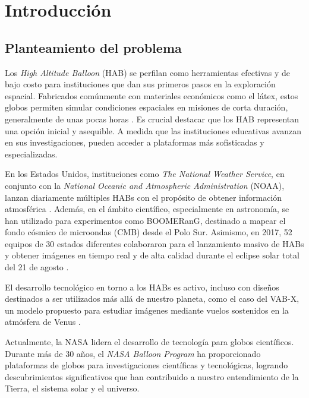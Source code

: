 \chapter{Introducción}

\section{Planteamiento del problema}
\vspace{1 cm}

Los \emph{High Altitude Balloon} (HAB) se perfilan como herramientas efectivas y de bajo costo para instituciones que dan sus primeros pasos en la exploración espacial. Fabricados comúnmente con materiales económicos como el látex, estos globos permiten simular condiciones espaciales en misiones de corta duración, generalmente de unas pocas horas \cite{Saad2015}. Es crucial destacar que los HAB representan una opción inicial y asequible. A medida que las instituciones educativas avanzan en sus investigaciones, pueden acceder a plataformas más sofisticadas y especializadas.

En los Estados Unidos, instituciones como \emph{The National Weather Service}, en conjunto con la \emph{National Oceanic and Atmospheric Administration} (NOAA), lanzan diariamente múltiples HABs con el propósito de obtener información atmosférica \cite{noaa_upperair, noaa_radiosondes}. Además, en el ámbito científico, especialmente en astronomía, se han utilizado para experimentos como BOOMERanG, destinado a mapear el fondo cósmico de microondas (CMB) desde el Polo Sur. Asimismo, en 2017, 52 equipos de 30 estados diferentes colaboraron para el lanzamiento masivo de HABs y obtener imágenes en tiempo real y de alta calidad durante el eclipse solar total del 21 de agosto \cite{Jarrell2017}.

El desarrollo tecnológico en torno a los HABs es activo, incluso con diseños destinados a ser utilizados más allá de nuestro planeta, como el caso del VAB-X, un modelo propuesto para estudiar imágenes mediante vuelos sostenidos en la atmósfera de Venus \cite{Bugga2022}.

Actualmente, la NASA lidera el desarrollo de tecnología para globos científicos. Durante más de 30 años, el \emph{NASA Balloon Program} ha proporcionado plataformas de globos para investigaciones científicas y tecnológicas, logrando descubrimientos significativos que han contribuido a nuestro entendimiento de la Tierra, el sistema solar y el universo.

\newpage

